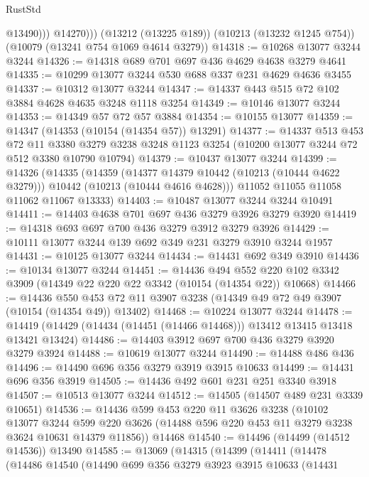 \begin{lexlean}{RustStd}
\begin{coremodule}
                @13490)))
          @14270)))
    (@13212 (@13225 @189))
    (@10213 (@13232 @1245 @754))
    (@10079 (@13241 @754 @1069 @4614 @3279))
@14318 := @10268 @13077 @3244 @3244
@14326 := @14318 @689 @701 @697 @436 @4629 @4638 @3279 @4641
@14335 := @10299 @13077 @3244 @530 @688 @337 @231 @4629 @4636 @3455
@14337 := @10312 @13077 @3244
@14347 := @14337 @443 @515 @72 @102 @3884 @4628 @4635 @3248 @1118 @3254
@14349 := @10146 @13077 @3244
@14353 := @14349 @57 @72 @57 @3884
@14354 := @10155 @13077
@14359 := @14347 (@14353 (@10154 (@14354 @57)) @13291)
@14377 := @14337
    @513
    @453
    @72
    @11
    @3380
    @3279
    @3238
    @3248
    @1123
    @3254
    (@10200 @13077 @3244 @72 @512 @3380 @10790 @10794)
@14379 := @10437 @13077 @3244
@14399 := @14326
    (@14335
      (@14359
        (@14377 @14379 @10442 (@10213 (@10444 @4622 @3279)))
        @10442
        (@10213 (@10444 @4616 @4628)))
      @11052
      @11055
      @11058
      @11062
      @11067
      @13333)
@14403 := @10487 @13077 @3244 @3244 @10491
@14411 := @14403 @4638 @701 @697 @436 @3279 @3926 @3279 @3920
@14419 := @14318 @693 @697 @700 @436 @3279 @3912 @3279 @3926
@14429 := @10111 @13077 @3244 @139 @692 @349 @231 @3279 @3910 @3244 @1957
@14431 := @10125 @13077 @3244
@14434 := @14431 @692 @349 @3910
@14436 := @10134 @13077 @3244
@14451 := @14436
    @494
    @552
    @220
    @102
    @3342
    @3909
    (@14349 @22 @220 @22 @3342 (@10154 (@14354 @22)) @10668)
@14466 := @14436
    @550
    @453
    @72
    @11
    @3907
    @3238
    (@14349 @49 @72 @49 @3907 (@10154 (@14354 @49)) @13402)
@14468 := @10224 @13077 @3244
@14478 := @14419 (@14429 (@14434 (@14451 (@14466 @14468))) @13412 @13415 @13418 @13421 @13424)
@14486 := @14403 @3912 @697 @700 @436 @3279 @3920 @3279 @3924
@14488 := @10619 @13077 @3244
@14490 := @14488 @486 @436
@14496 := @14490 @696 @356 @3279 @3919 @3915 @10633
@14499 := @14431 @696 @356 @3919
@14505 := @14436 @492 @601 @231 @251 @3340 @3918
@14507 := @10513 @13077 @3244
@14512 := @14505 (@14507 @489 @231 @3339 @10651)
@14536 := @14436
    @599
    @453
    @220
    @11
    @3626
    @3238
    (@10102
      @13077
      @3244
      @599
      @220
      @3626
      (@14488 @596 @220 @453 @11 @3279 @3238 @3624 @10631 @14379 @11856))
    @14468
@14540 := @14496 (@14499 (@14512 @14536)) @13490
@14585 := @13069
    (@14315
      (@14399
        (@14411
          (@14478
            (@14486
              @14540
              (@14490
                @699
                @356
                @3279
                @3923
                @3915
                @10633
                (@14431

\end{coremodule}
\end{lexlean}
